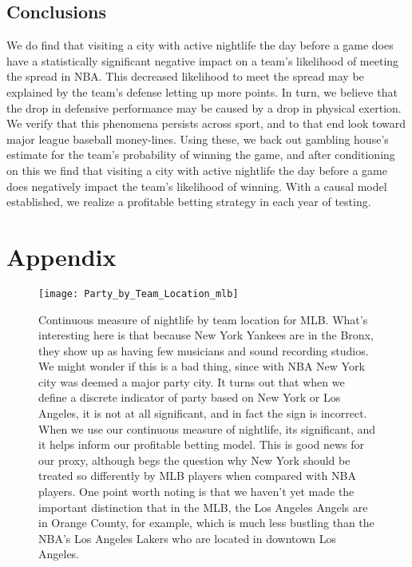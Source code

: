 \documentclass[letterpaper,12pt]{article}
\begin{document}
\subsection{Conclusions}
We do find that visiting a city with active nightlife the day before a game does have 
a statistically significant negative impact on a team's likelihood of meeting the spread in NBA. This decreased likelihood to meet the spread may be explained 
by the team's defense letting up more points. In turn, we believe that the drop in
defensive performance may be caused by a drop in physical exertion.
We verify that this phenomena persists across sport, and 
to that end look toward major league baseball money-lines. Using these, we back out gambling
house's estimate for the team's probability of winning the game, and after conditioning on this
we find that visiting a city with active nightlife the day before a game does negatively 
impact the team's likelihood of winning.
With a causal model established, we realize a profitable betting strategy in each year of testing.




\section{Appendix}

\begin{figure}   
  \centering
  \hspace{-55pt}
  \label{fig: party by team location mlb}
  \texttt{[image: Party\_by\_Team\_Location\_mlb]}
  \caption{Continuous measure of nightlife by team location for MLB. What's interesting here is that because New York Yankees are in the Bronx, they show up as having few musicians and sound recording studios. We might wonder if this is a bad thing, since with NBA New York city was deemed a major party city. It turns out that when we define a discrete indicator of party based on New York or Los Angeles, it is not at all significant, and in fact the sign is incorrect. When we use our continuous
 measure of nightlife, its significant, and it helps inform our profitable betting model.
This is good news for our proxy, although begs the question why New York should be treated so differently by MLB players when compared with NBA players. One point worth noting is that we haven't yet made the important distinction that in the MLB, the Los Angeles Angels are in Orange County, for example, which is much less bustling than the NBA's  Los Angeles Lakers who are located in downtown Los Angeles.}
\end{figure}
\end{document}
